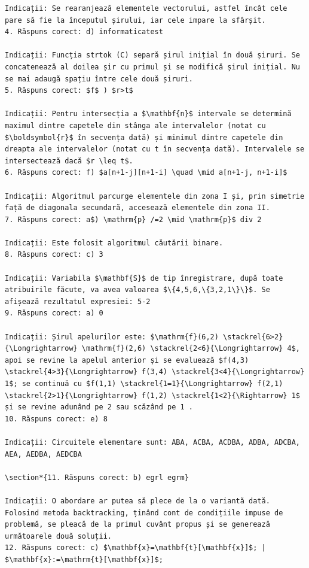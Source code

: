 \documentclass[10pt]{article}
\begin{document}
\begin{verbatim}
Indicații: Se rearanjează elementele vectorului, astfel încât cele pare să fie la începutul șirului, iar cele impare la sfârșit.
4. Răspuns corect: d) informaticatest

Indicații: Funcția strtok (C) separă șirul inițial în două șiruri. Se concatenează al doilea șir cu primul și se modifică șirul inițial. Nu se mai adaugă spațiu între cele două șiruri.
5. Răspuns corect: $f$ ) $r>t$

Indicații: Pentru intersecția a $\mathbf{n}$ intervale se determină maximul dintre capetele din stânga ale intervalelor (notat cu $\boldsymbol{r}$ în secvența dată) și minimul dintre capetele din dreapta ale intervalelor (notat cu t în secvența dată). Intervalele se intersectează dacă $r \leq t$.
6. Răspuns corect: f) $a[n+1-j][n+1-i] \quad \mid a[n+1-j, n+1-i]$

Indicații: Algoritmul parcurge elementele din zona I și, prin simetrie față de diagonala secundară, accesează elementele din zona II.
7. Răspuns corect: a$) \mathrm{p} /=2 \mid \mathrm{p}$ div 2

Indicații: Este folosit algoritmul căutării binare.
8. Răspuns corect: c) 3

Indicații: Variabila $\mathbf{S}$ de tip înregistrare, după toate atribuirile făcute, va avea valoarea $\{4,5,6,\{3,2,1\}\}$. Se afișează rezultatul expresiei: 5-2
9. Răspuns corect: a) 0

Indicații: Șirul apelurilor este: $\mathrm{f}(6,2) \stackrel{6>2}{\Longrightarrow} \mathrm{f}(2,6) \stackrel{2<6}{\Longrightarrow} 4$, apoi se revine la apelul anterior și se evaluează $f(4,3) \stackrel{4>3}{\Longrightarrow} f(3,4) \stackrel{3<4}{\Longrightarrow} 1$; se continuă cu $f(1,1) \stackrel{1=1}{\Longrightarrow} f(2,1) \stackrel{2>1}{\Longrightarrow} f(1,2) \stackrel{1<2}{\Rightarrow} 1$ și se revine adunând pe 2 sau scăzând pe 1 .
10. Răspuns corect: e) 8

Indicații: Circuitele elementare sunt: ABA, ACBA, ACDBA, ADBA, ADCBA, AEA, AEDBA, AEDCBA

\section*{11. Răspuns corect: b) egrl egrm}

Indicații: O abordare ar putea să plece de la o variantă dată. Folosind metoda backtracking, ținând cont de condițiile impuse de problemă, se pleacă de la primul cuvânt propus și se generează următoarele două soluții.
12. Răspuns corect: c) $\mathbf{x}=\mathbf{t}[\mathbf{x}]$; | $\mathbf{x}:=\mathrm{t}[\mathbf{x}]$;


\end{verbatim}
\end{document}
